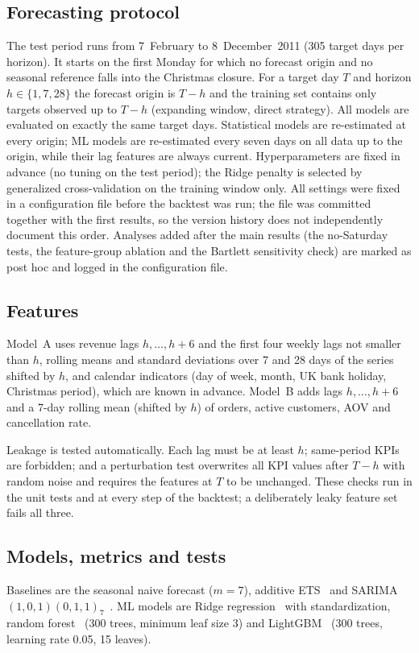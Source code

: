 \documentclass[conference]{IEEEtran}
\begin{document}
\subsection{Forecasting protocol}
The test period runs from 7~February to 8~December~2011 (305 target days per horizon). %
It starts on the first Monday for which no forecast origin and no seasonal reference falls into the
Christmas closure. For a target day $T$ and horizon $h\in\{1,7,28\}$ the forecast origin is $T-h$ and the
training set contains only targets observed up to $T-h$ (expanding window, direct strategy). All models are
evaluated on exactly the same target days. Statistical models are re-estimated at every origin; ML models
are re-estimated every seven days on all data up to the origin, while their lag features are always current.
Hyperparameters are fixed in advance (no tuning on the test period); the Ridge penalty is selected by
generalized cross-validation on the training window only. All settings were fixed in a configuration file
before the backtest was run; the file was committed together with the first results, so the version history
does not independently document this order. Analyses added after the main results (the no-Saturday tests,
the feature-group ablation and the Bartlett sensitivity check) are marked as post hoc and logged in the
configuration file.

\subsection{Features}
Model~A uses revenue lags $h,\dots,h+6$ and the first four weekly lags not smaller than $h$, rolling means and
standard deviations over 7 and 28 days of the series shifted by $h$, and calendar indicators (day of week,
month, UK bank holiday, Christmas period), which are known in advance. Model~B adds lags $h,\dots,h+6$ and a
7-day rolling mean (shifted by $h$) of orders, active customers, AOV and cancellation rate.

Leakage is tested automatically. Each lag must be at least $h$; same-period KPIs are forbidden; and a
perturbation test overwrites all KPI values after $T-h$ with random noise and requires the features at $T$
to be unchanged. These checks run in the unit tests and at every step of the backtest; a deliberately leaky
feature set fails all three.

\subsection{Models, metrics and tests}
Baselines are the seasonal naive forecast ($m=7$), additive ETS~\cite{hyndman2002} and
SARIMA$(1,0,1)(0,1,1)_7$~\cite{box2015}. ML models are Ridge
regression~\cite{hoerl1970} with standardization, random forest~\cite{breiman2001} (300 trees, minimum leaf
size 3) and LightGBM~\cite{ke2017lightgbm} (300 trees, learning rate 0.05, 15 leaves).
\end{document}
